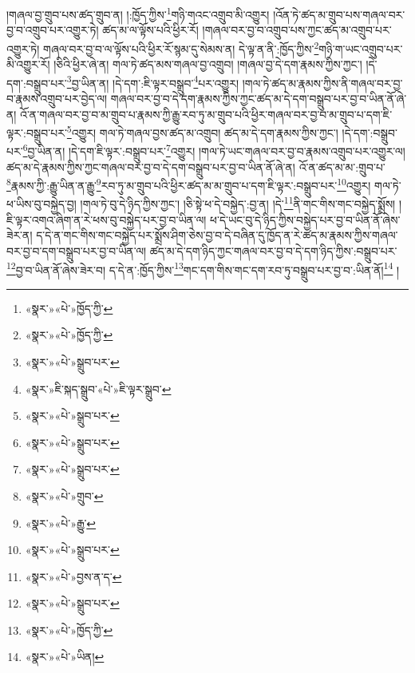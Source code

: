 །གཞལ་བྱ་གྲུབ་པས་ཚད་གྲུབ་ན། །:ཁྱོད་ཀྱིས་\footnote{«སྣར་»«པེ་»ཁྱོད་ཀྱི་}གཉི་གའང་འགྲུབ་མི་འགྱུར། །འོན་ཏེ་ཚད་མ་གྲུབ་པས་གཞལ་བར་བྱ་བ་འགྲུབ་པར་འགྱུར་ཏེ། ཚད་མ་ལ་ལྟོས་པའི་ཕྱིར་རོ། །གཞལ་བར་བྱ་བ་འགྲུབ་པས་ཀྱང་ཚད་མ་འགྲུབ་པར་འགྱུར་ཏེ། གཞལ་བར་བྱ་བ་ལ་ལྟོས་པའི་ཕྱིར་རོ་སྙམ་དུ་སེམས་ན། དེ་ལྟ་ན་ནི་:ཁྱོད་ཀྱིས་\footnote{«སྣར་»«པེ་»ཁྱོད་ཀྱི་}གཉི་ག་ཡང་འགྲུབ་པར་མི་འགྱུར་རོ། །ཅིའི་ཕྱིར་ཞེ་ན། གལ་ཏེ་ཚད་མས་གཞལ་བྱ་འགྲུབ། །གཞལ་བྱ་དེ་དག་རྣམས་ཀྱིས་ཀྱང་། །དེ་དག་:བསྒྲུབ་པར་\footnote{«སྣར་»«པེ་»སྒྲུབ་པར་}བྱ་ཡིན་ན། །དེ་དག་:ཇི་ལྟར་བསྒྲུབ་\footnote{«སྣར་»ཇི་སྐད་སྒྲུབ་«པེ་»ཇི་ལྟར་སྒྲུབ་}པར་འགྱུར། །གལ་ཏེ་ཚད་མ་རྣམས་ཀྱིས་ནི་གཞལ་བར་བྱ་བ་རྣམས་འགྲུབ་པར་བྱེད་ལ། གཞལ་བར་བྱ་བ་དེ་དག་རྣམས་ཀྱིས་ཀྱང་ཚད་མ་དེ་དག་བསྒྲུབ་པར་བྱ་བ་ཡིན་ནོ་ཞེ་ན། འོ་ན་གཞལ་བར་བྱ་བ་མ་གྲུབ་པ་རྣམས་ཀྱི་རྒྱུ་རབ་ཏུ་མ་གྲུབ་པའི་ཕྱིར་གཞལ་བར་བྱ་བ་མ་གྲུབ་པ་དག་ཇི་ལྟར་:བསྒྲུབ་པར་\footnote{«སྣར་»«པེ་»སྒྲུབ་པར་}འགྱུར། གལ་ཏེ་གཞལ་བྱས་ཚད་མ་འགྲུབ། ཚད་མ་དེ་དག་རྣམས་ཀྱིས་ཀྱང་། །དེ་དག་:བསྒྲུབ་པར་\footnote{«སྣར་»«པེ་»སྒྲུབ་པར་}བྱ་ཡིན་ན། །དེ་དག་ཇི་ལྟར་:བསྒྲུབ་པར་\footnote{«སྣར་»«པེ་»སྒྲུབ་པར་}འགྱུར། །གལ་ཏེ་ཡང་གཞལ་བར་བྱ་བ་རྣམས་འགྲུབ་པར་འགྱུར་ལ། ཚད་མ་དེ་རྣམས་ཀྱིས་ཀྱང་གཞལ་བར་བྱ་བ་དེ་དག་བསྒྲུབ་པར་བྱ་བ་ཡིན་ནོ་ཞེ་ན། འོ་ན་ཚད་མ་མ་:གྲུབ་པ་\footnote{«སྣར་»«པེ་»གྲུབ་}རྣམས་ཀྱི་:རྒྱུ་ཡིན་ན་རྒྱུ་\footnote{«སྣར་»«པེ་»རྒྱུ་}རབ་ཏུ་མ་གྲུབ་པའི་ཕྱིར་ཚད་མ་མ་གྲུབ་པ་དག་ཇི་ལྟར་:བསྒྲུབ་པར་\footnote{«སྣར་»«པེ་»སྒྲུབ་པར་}འགྱུར། གལ་ཏེ་ཕ་ཡིས་བུ་བསྐྱེད་བྱ། །གལ་ཏེ་བུ་དེ་ཉིད་ཀྱིས་ཀྱང་། །ཅི་སྟེ་ཕ་དེ་བསྐྱེད་:བྱ་ན། །དེ་\footnote{«སྣར་»«པེ་»བྱས་ན་ད་}ནི་གང་གིས་གང་བསྐྱེད་སྨྲོས། །ཇི་ལྟར་འགའ་ཞིག་ན་རེ་ཕས་བུ་བསྐྱེད་པར་བྱ་བ་ཡིན་ལ། ཕ་དེ་ཡང་བུ་དེ་ཉིད་ཀྱིས་བསྐྱེད་པར་བྱ་བ་ཡིན་ནོ་ཞེས་ཟེར་ན། ད་དེ་ན་གང་གིས་གང་བསྐྱེད་པར་སྨྲོས་ཤིག་ཅེས་བྱ་བ་དེ་བཞིན་དུ་ཁྱོད་ན་རེ་ཚད་མ་རྣམས་ཀྱིས་གཞལ་བར་བྱ་བ་དག་བསྒྲུབ་པར་བྱ་བ་ཡིན་ལ། ཚད་མ་དེ་དག་ཉིད་ཀྱང་གཞལ་བར་བྱ་བ་དེ་དག་ཉིད་ཀྱིས་:བསྒྲུབ་པར་\footnote{«སྣར་»«པེ་»སྒྲུབ་པར་}བྱ་བ་ཡིན་ནོ་ཞེས་ཟེར་བ། ད་དེ་ན་:ཁྱོད་ཀྱིས་\footnote{«སྣར་»«པེ་»ཁྱོད་ཀྱི་}གང་དག་གིས་གང་དག་རབ་ཏུ་བསྒྲུབ་པར་བྱ་བ་:ཡིན་ནོ།\footnote{«སྣར་»«པེ་»ཡིན།} །
